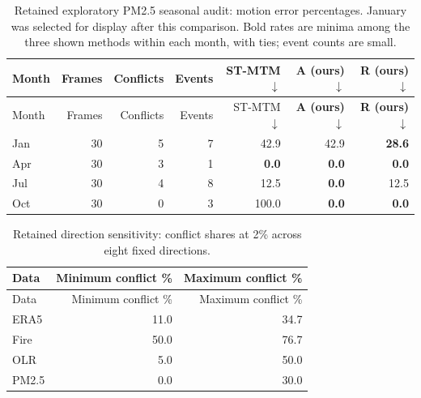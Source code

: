 \begingroup\small\setlength{\tabcolsep}{4pt}
\begin{longtable}{lrrrrrr}
\caption{Retained exploratory PM2.5 seasonal audit: motion error percentages. January was selected for display after this comparison. Bold rates are minima among the three shown methods within each month, with ties; event counts are small.}\\\toprule
Month & Frames & Conflicts & Events & ST-MTM $\downarrow$ & \textbf{A (ours)} $\downarrow$ & \textbf{R (ours)} $\downarrow$\\\midrule\endfirsthead
\toprule Month & Frames & Conflicts & Events & ST-MTM $\downarrow$ & \textbf{A (ours)} $\downarrow$ & \textbf{R (ours)} $\downarrow$\\\midrule\endhead
\bottomrule\endfoot
Jan & 30 & 5 & 7 & 42.9 & 42.9 & \textbf{28.6}\\
Apr & 30 & 3 & 1 & \textbf{0.0} & \textbf{0.0} & \textbf{0.0}\\
Jul & 30 & 4 & 8 & 12.5 & \textbf{0.0} & 12.5\\
Oct & 30 & 0 & 3 & 100.0 & \textbf{0.0} & \textbf{0.0}\\
\end{longtable}\endgroup

\begingroup\small\setlength{\tabcolsep}{4pt}
\begin{longtable}{lrr}
\caption{Retained direction sensitivity: conflict shares at 2\% across eight fixed directions.}\\\toprule
Data & Minimum conflict \% & Maximum conflict \%\\\midrule\endfirsthead
\toprule Data & Minimum conflict \% & Maximum conflict \%\\\midrule\endhead
\bottomrule\endfoot
ERA5 & 11.0 & 34.7\\
Fire & 50.0 & 76.7\\
OLR & 5.0 & 50.0\\
PM2.5 & 0.0 & 30.0\\
\end{longtable}\endgroup
